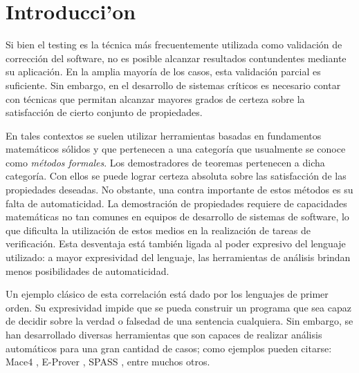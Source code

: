 \chapter{Introducci'on}


Si bien el testing es la técnica más frecuentemente utilizada como validación de corrección del software, no es posible alcanzar resultados contundentes mediante su aplicación. 
En la amplia mayoría de los casos, esta validación parcial es suficiente. 
Sin embargo, en el desarrollo de sistemas críticos es necesario contar con técnicas que permitan alcanzar mayores grados de certeza sobre la satisfacción de cierto conjunto de propiedades.

En tales contextos se suelen utilizar herramientas basadas en fundamentos matemáticos sólidos y que pertenecen a una categoría que usualmente se conoce como \emph{métodos formales}. 
Los demostradores de teoremas pertenecen a dicha categoría. 
Con ellos se puede lograr certeza absoluta sobre las satisfacción de las propiedades deseadas. 
No obstante, una contra importante de estos métodos es su falta de automaticidad. 
La demostración de propiedades requiere de capacidades matemáticas no tan comunes en equipos de desarrollo de sistemas de software, lo que dificulta la utilización de estos medios en la realización de tareas de verificación. 
Esta desventaja está también ligada al poder expresivo del lenguaje utilizado: a mayor expresividad del lenguaje, las herramientas de análisis brindan menos posibilidades de automaticidad.

Un ejemplo clásico de esta correlación está dado por los lenguajes de primer orden. 
Su expresividad impide que se pueda construir un programa que sea capaz de decidir sobre la verdad o falsedad de una sentencia cualquiera. 
Sin embargo, se han desarrollado diversas herramientas que son capaces de realizar análisis automáticos para una gran cantidad de casos; como ejemplos pueden citarse: Mace4 \cite{m05}, E-Prover \cite{s13}, SPASS \cite{WDFKSW09}, entre muchos otros. 


